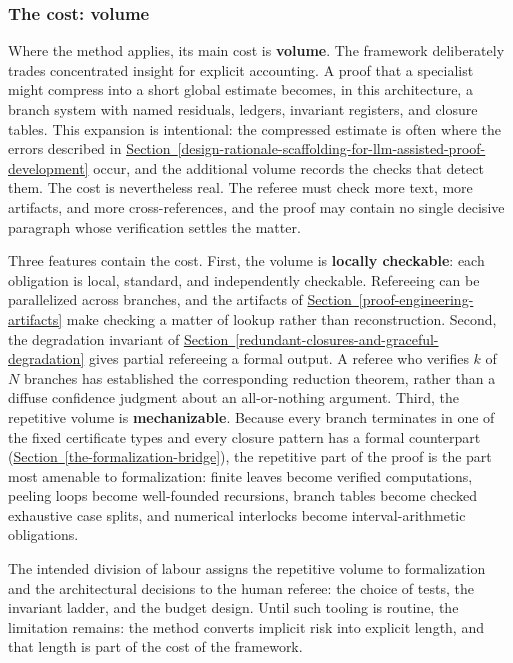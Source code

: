 \documentclass[
  11pt,
]{article}
\theoremstyle{definition}
\newcommand{\secref}[1]{\hyperref[#1]{Section~\ref*{#1}}}
\begin{document}
\subsubsection{The cost: volume}\label{the-cost-volume}

Where the method applies, its main cost is \textbf{volume}. The
framework deliberately trades concentrated insight for explicit
accounting. A proof that a specialist might compress into a short global
estimate becomes, in this architecture, a branch system with named
residuals, ledgers, invariant registers, and closure tables. This
expansion is intentional: the compressed estimate is often where the
errors described in \secref{design-rationale-scaffolding-for-llm-assisted-proof-development} occur, and the additional volume records
the checks that detect them. The cost is nevertheless real. The referee
must check more text, more artifacts, and more cross-references, and the
proof may contain no single decisive paragraph whose verification
settles the matter.

Three features contain the cost. First, the volume is \textbf{locally
checkable}: each obligation is local, standard, and independently
checkable. Refereeing can be parallelized across branches, and the
artifacts of \secref{proof-engineering-artifacts} make checking a matter of lookup rather than
reconstruction. Second, the degradation invariant of \secref{redundant-closures-and-graceful-degradation} gives
partial refereeing a formal output. A referee who verifies \(k\) of
\(N\) branches has established the corresponding reduction theorem,
rather than a diffuse confidence judgment about an all-or-nothing
argument. Third, the repetitive volume is \textbf{mechanizable}. Because
every branch terminates in one of the fixed certificate types and every
closure pattern has a formal counterpart (\secref{the-formalization-bridge}), the repetitive
part of the proof is the part most amenable to formalization: finite
leaves become verified computations, peeling loops become well-founded
recursions, branch tables become checked exhaustive case splits, and
numerical interlocks become interval-arithmetic obligations.

The intended division of labour assigns the repetitive volume to
formalization and the architectural decisions to the human referee: the
choice of tests, the invariant ladder, and the budget design. Until such
tooling is routine, the limitation remains: the method converts implicit
risk into explicit length, and that length is part of the cost of the
framework.
\end{document}
